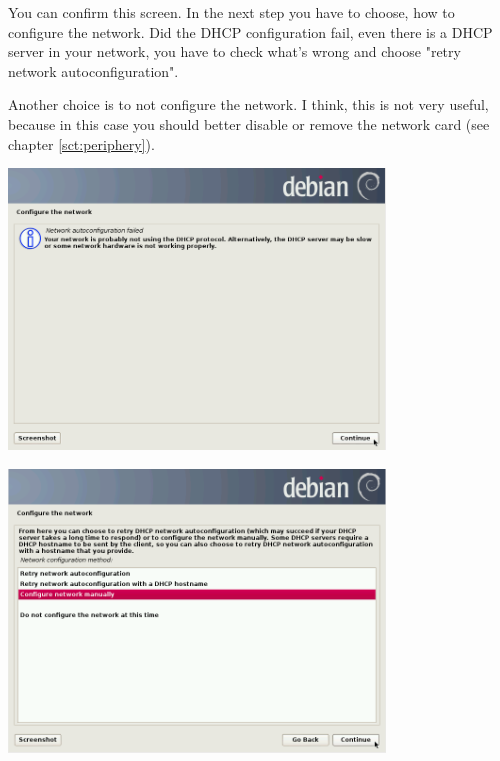 \documentclass[a4paper,12pt,twoside]{article}
\begin{document}
You can confirm this screen. In the next step you have to choose, how to
configure the network. Did the DHCP configuration fail, even there is a
DHCP server in your network, you have to check what's
wrong and choose "retry network autoconfiguration".

Another choice is to not configure the network. I think, this is not
very useful, because in this case you should better disable or remove
the network card (see chapter \ref{sct:periphery}).

\begin{minipage}{\linewidth}
    \centering
    \includegraphics[width=10cm]{efaLiveen-img/efaLiveen-img7.png}
    \label{fig:dhcp_error}
\end{minipage}

\begin{minipage}{\linewidth}
    \centering
    \includegraphics[width=10cm]{efaLiveen-img/efaLiveen-img8.png}
    \label{fig:network_manual}
\end{minipage}
\end{document}
